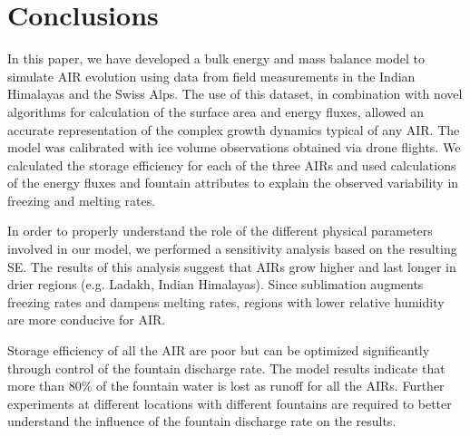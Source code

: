 \documentclass[utf8]{frontiersSCNS} %
\begin{document}



\section{Conclusions}
In this paper, we have developed a bulk energy and mass balance model to simulate AIR evolution using data from field measurements in the Indian
Himalayas and the Swiss Alps. The use of this dataset, in combination with novel algorithms for calculation of the surface
area and energy fluxes, allowed an accurate representation of the complex growth dynamics typical of any AIR. The model
was calibrated with ice volume observations obtained via drone flights. We calculated the storage
efficiency for each of the three AIRs and used calculations of the energy fluxes and fountain attributes to explain the
observed variability in freezing and melting rates.

In order to properly understand the role of the different physical parameters involved in our model, we performed a sensitivity analysis based on the resulting SE. The results of this analysis suggest that AIRs grow higher and last longer in drier regions (e.g. Ladakh, Indian Himalayas). Since sublimation augments freezing rates and dampens melting
rates, regions with lower relative humidity are more conducive for AIR.

Storage efficiency of all the AIR are poor but can be optimized significantly through control of the fountain discharge
rate.  The model results indicate that more than 80\% of the fountain water is lost as runoff for all the AIRs.
Further experiments at different locations with different fountains are required to better understand the influence of
the fountain discharge rate on the results.
\end{document}

